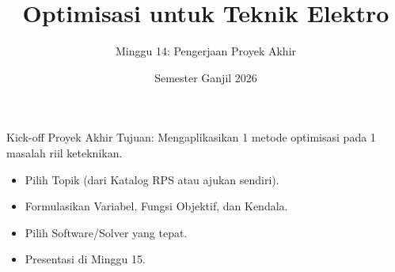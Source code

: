 \documentclass[aspectratio=169]{beamer}
\title{Optimisasi untuk Teknik Elektro}\subtitle{Minggu 14: Pengerjaan Proyek Akhir}
\date{Semester Ganjil 2026}
\begin{document}
\begin{frame}\titlepage\end{frame}
\begin{frame}{Kick-off Proyek Akhir}
Tujuan: Mengaplikasikan 1 metode optimisasi pada 1 masalah riil keteknikan.
\begin{itemize}
\item Pilih Topik (dari Katalog RPS atau ajukan sendiri).
\item Formulasikan Variabel, Fungsi Objektif, dan Kendala.
\item Pilih Software/Solver yang tepat.
\item Presentasi di Minggu 15.
\end{itemize}
\end{frame}
\end{document}
